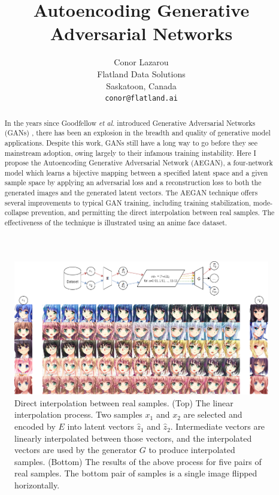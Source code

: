 \documentclass{article}
\title{Autoencoding Generative Adversarial Networks}
\author{
  Conor Lazarou \\
  Flatland Data Solutions\\
  Saskatoon, Canada \\
  \texttt{conor@flatland.ai} \\
}
\begin{document}
\maketitle

\begin{figure}[h] %
    \centering
    \includegraphics[width=16cm]{interpolation.png}
    \caption{Direct interpolation between real samples. (Top) The linear interpolation process. Two samples $x_1$ and $x_2$ are selected and encoded by $E$ into latent vectors $\hat{z}_1$ and $\hat{z}_2$. Intermediate vectors are linearly interpolated between those vectors, and the interpolated vectors are used by the generator $G$ to produce interpolated samples. (Bottom) The results of the above process for five pairs of real samples. The bottom pair of samples is a single image flipped horizontally.}
    \label{fig:interpolation}
\end{figure}

\begin{abstract}
In the years since Goodfellow \textit{et al.} introduced Generative Adversarial Networks (GANs) \cite{goodfellow2014generative}, there has been an explosion in the breadth and quality of generative model applications. Despite this work, GANs still have a long way to go before they see mainstream adoption, owing largely to their infamous training instability. Here I propose the Autoencoding Generative Adversarial Network (AEGAN), a four-network model which learns a bijective mapping between a specified latent space and a given sample space by applying an adversarial loss and a reconstruction loss to both the generated images and the generated latent vectors. The AEGAN technique offers several improvements to typical GAN training, including training stabilization, mode-collapse prevention, and permitting the direct interpolation between real samples. The effectiveness of the technique is illustrated using an anime face dataset.
\end{abstract}
\end{document}
